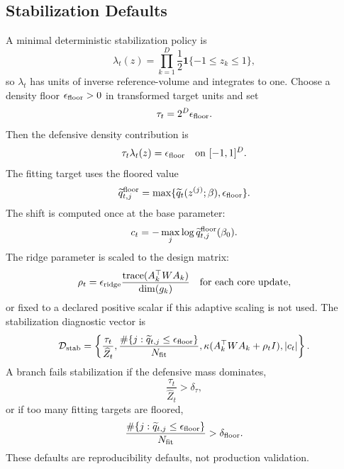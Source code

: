 \documentclass[11pt]{article}
\numberwithin{equation}{section}
\newcommand{\ind}{\mathbf 1}
\begin{document}
\subsection*{Stabilization Defaults}

A minimal deterministic stabilization policy is
\begin{equation}
    \lambda_t(z)=\prod_{k=1}^D\frac12\ind\{-1\le z_k\le1\},
    \label{eq:p24-p23-stab1}
\end{equation}
so \(\lambda_t\) has units of inverse reference-volume and integrates to one.
Choose a density floor \(\epsilon_{\rm floor}>0\) in transformed target units
and set
\begin{equation}
    \tau_t=2^D\epsilon_{\rm floor}.
    \label{eq:p24-p23-stab2}
\end{equation}
Then the defensive density contribution is
\begin{equation}
    \tau_t\lambda_t(z)=\epsilon_{\rm floor}
    \quad\text{on }[-1,1]^D.
    \label{eq:p24-p23-stab3}
\end{equation}
The fitting target uses the floored value
\begin{equation}
    \widetilde q_{t,j}^{\rm floor}
    =
    \max\{\widetilde q_t(z^{(j)};\beta),\epsilon_{\rm floor}\}.
    \label{eq:p24-p23-stab4}
\end{equation}
The shift is computed once at the base parameter:
\begin{equation}
    c_t
    =
    -\max_j\log \widetilde q_{t,j}^{\rm floor}(\beta_0).
    \label{eq:p24-p23-stab5}
\end{equation}
The ridge parameter is scaled to the design matrix:
\begin{equation}
    \rho_t
    =
    \epsilon_{\rm ridge}
    \frac{\operatorname{trace}(A_k^\top W A_k)}
    {\dim(g_k)}
    \quad\text{for each core update,}
    \label{eq:p24-p23-stab6}
\end{equation}
or fixed to a declared positive scalar if this adaptive scaling is not used.
The stabilization diagnostic vector is
\begin{equation}
    \mathcal D_{\rm stab}
    =
    \left\{
    \frac{\tau_t}{\widehat Z_t},
    \frac{\#\{j:\widetilde q_{t,j}\le\epsilon_{\rm floor}\}}{N_{\rm fit}},
    \kappa(A_k^\top W A_k+\rho_t I),
    |c_t|
    \right\}.
    \label{eq:p24-p23-stab7}
\end{equation}
A branch fails stabilization if the defensive mass dominates,
\begin{equation}
    \frac{\tau_t}{\widehat Z_t}>\delta_\tau,
    \label{eq:p24-p23-stab8}
\end{equation}
or if too many fitting targets are floored,
\begin{equation}
    \frac{\#\{j:\widetilde q_{t,j}\le\epsilon_{\rm floor}\}}{N_{\rm fit}}
    >
    \delta_{\rm floor}.
    \label{eq:p24-p23-stab9}
\end{equation}
These defaults are reproducibility defaults, not production validation.
\end{document}

